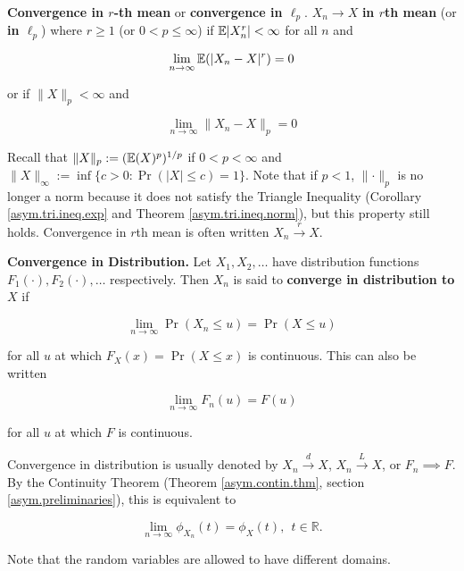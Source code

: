 \begin{definition}
\textbf{Convergence in \(r\)-th mean} or \textbf{convergence in \(\ell_p\)}. \(X_n \to X\) \textbf{in \(r\)th mean}  (or \textbf{in \(\ell_p\)}) where \(r \geq 1\) (or \(0 < p \leq \infty\)) if \(\mathbb{E}|X_n^r| < \infty\) for all \(n\) and

\[
\lim_{n \to \infty} \mathbb{E}(|X_n - X|^r) = 0
\]

or if \(\lVert X \rVert_p < \infty\) and

\[
\lim_{n \to \infty} \lVert X_n - X \rVert _p = 0
\]

\begin{remark}
Recall that \(\lVert X \rVert_p := (\mathbb{E}(X)^p)^{1/p}\) if \(0 < p < \infty\) and \(\lVert X \rVert_\infty := \inf \{c >0: \Pr(|X| \leq c ) = 1\}\). Note that if \(p < 1\), \(\lVert \cdot \rVert_p\) is no longer a norm because it does not satisfy the Triangle Inequality (Corollary \ref{asym.tri.ineq.exp} and Theorem \ref{asym.tri.ineq.norm}), but this property still holds. Convergence in \(r\)th mean is often written \(X_n \xrightarrow{r} X\).
\end{remark}
\end{definition}

\begin{definition}
\textbf{Convergence in Distribution.} Let \(X_1, X_2, \ldots\) have distribution functions \(F_1(\cdot), F_2(\cdot), \ldots \) respectively. Then \(X_n\) is said to \textbf{converge in distribution to \(X\)} if

\[
\lim_{n \to \infty} \Pr(X_n \leq u) = \Pr(X \leq u)
\]

for all \(u\) at which \(F_X(x) = \Pr(X \leq x)\) is continuous. This can also be written

\[
\lim_{n \to \infty} F_n(u) = F(u)
\]

for all \(u\) at which \(F\) is continuous.

\begin{remark}Convergence in distribution is usually denoted by \(X_n \xrightarrow{d} X\), \(X_n \xrightarrow{L} X\), or \(F_n \implies F\). By the Continuity Theorem (Theorem \ref{asym.contin.thm}, section \ref{asym.preliminaries}), this is equivalent to

\[
\lim_{n \to \infty} \phi_{X_n}(t) = \phi_X(t), \ \ t \in \mathbb{R}.
\]

Note that the random variables are allowed to have different domains.
\end{remark}
\end{definition}

